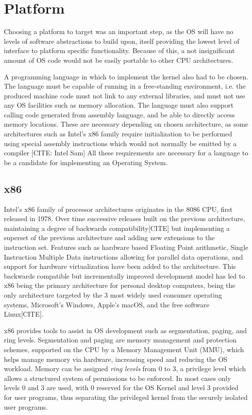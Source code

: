 \documentclass[11pt]{report}
\begin{document}
\section{Platform}
Choosing a platform to target was an important step, as the OS will have no levels of software abstractions to build upon, itself providing the lowest level of interface to platform specific functionality. Because of this, a not insignificant amount of OS code would not be easily portable to other CPU architectures.

A programming language in which to implement the kernel also had to be chosen. The language must be capable of running in a free-standing environment, i.e. the produced machine code must not link to any external libraries, and must not use any OS facilities such as memory allocation. The language must also support calling code generated from assembly language, and be able to directly access memory locations. These are necessary depending on chosen architecture, as some architectures such as Intel's x86 family require initialization to be performed using special assembly instructions which would not normally be emitted by a compiler [CITE: Intel Sam] All these requirements are necessary for a language to be a candidate for implementing an Operating System. 

\subsection{x86}
Intel's x86 family of processor architectures originates in the 8086 CPU, first released in 1978\cite{intel-hall-of-fame}. Over time successive releases built on the previous architecture, maintaining a degree of backwards compatibility[CITE] but implementing a superset of the previous architecture and adding new extensions to the instruction set. Features such as hardware based Floating Point arithmetic, Single Instruction Multiple Data instructions allowing for parallel data operations, and support for hardware virtualization have been added to the architecture. This backwards compatible but incrementally improved development model has led to x86 being the primary architecture for personal desktop computers, being the only architecture targeted by the 3 most widely used consumer operating systems, Microsoft's Windows, Apple's macOS, and the free software Linux[CITE].

x86 provides tools to assist in OS development such as segmentation, paging, and ring levels. Segmentation and paging are memory management and protection schemes, supported on the CPU by a Memory Management Unit (MMU), which helps manage memory via hardware, increasing speed and reducing the OS workload. Memory can be assigned \textit{ring levels} from 0 to 3, a privilege level which allows a structured system of permissions to be enforced. In most cases only levels 0 and 3 are used, with 0 reserved for the OS Kernel and level 3 provided for user programs, thus separating the privileged kernel from the securely isolated user programs.
\end{document}
